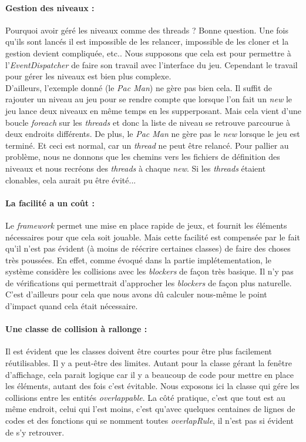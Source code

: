 \documentclass[a4paper,10pt]{article}
\begin{document}
    \paragraph{Gestion des niveaux : }
        Pourquoi avoir géré les niveaux comme des threads ? Bonne question. Une fois qu'ils sont lancés il est impossible de les
        relancer, impossible de les cloner et la gestion devient compliquée, etc.. Nous supposons que cela est pour permettre
        à l'\textit{EventDispatcher} de faire son travail avec l'interface du jeu. Cependant le travail pour gérer
        les niveaux est bien plus complexe. \\
        D'ailleurs, l'exemple donné (le \textit{Pac Man}) ne gère pas bien cela. Il suffit de rajouter un niveau au jeu 
        pour se rendre compte que lorsque l'on fait un \textit{new} le jeu lance
        deux niveaux en même temps en les supperposant. Mais cela vient d'une boucle \textit{foreach} sur les \textit{threads} et donc
        la liste de niveau se retrouve parcourue à deux endroits différents. De plus, le \textit{Pac Man} ne gère
        pas le \textit{new} lorsque le jeu est terminé. Et ceci est normal, car un \textit{thread} ne peut être
        relancé. Pour pallier au problème, nous ne donnons que les chemins vers les fichiers de définition des
        niveaux et nous recréons des \textit{threads} à chaque \textit{new}. Si les \textit{threads} étaient
        clonables, cela aurait pu être évité...

    \paragraph{La facilité a un coût : }
        Le \textit{framework} permet une mise en place rapide de jeux, et fournit les éléments nécessaires pour
        que cela soit jouable. Mais cette facilité est compensée par le fait qu'il n'est pas évident (à moins
        de réécrire certaines classes) de faire des choses très poussées. En effet, comme évoqué dans la partie
        implétementation, le système considère les collisions avec les \textit{blockers} de façon très basique.
        Il n'y pas de vérifications qui permettrait d'approcher les \textit{blockers} de façon plus
        naturelle. C'est d'ailleurs pour cela que nous avons dû calculer nous-même le point d'impact quand cela
        était nécessaire.

    \paragraph{Une classe de collision à rallonge : }
        Il est évident que les classes doivent être courtes pour être plus facilement réutilisables. Il y a peut-être
        des limites. Autant pour la classe gérant la fenêtre d'affichage, cela parait logique car il y a beaucoup
        de code pour mettre en place les éléments, autant des fois c'est évitable. Nous exposons ici la classe
        qui gére les collisions entre les entités \textit{overlappable}. La côté pratique, c'est que tout est au
        même endroit, celui qui l'est moins, c'est qu'avec quelques centaines de lignes de codes et des fonctions
        qui se nomment toutes \textit{overlapRule}, il n'est pas si évident de s'y retrouver.
\end{document}
